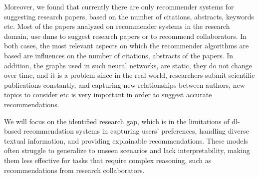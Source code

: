 Moreover, we found that currently there are only recommender systems for suggesting research papers, based on the number of citations, abstracts, keywords etc.
Most of the papers analyzed on recommender systems in the research domain, use \glspl{dnn} to suggest research papers or to recommend collaborators.
In both cases, the most relevant aspects on which the recommender algorithms are based are influences on the number of citations, abstracts of the papers.
In addition, the graphs used in such neural networks, are static, they do not change over time, and it is a problem since in the real world, researchers submit scientific publications constantly, and capturing new relationships between authors, new topics to consider etc is very important in order to suggest accurate recommendations.

We will focus on the identified research gap, which is in the limitations of \gls{dl}-based recommendation systems in capturing users' preferences, handling diverse textual information, and providing explainable recommendations.
These models often struggle to generalize to unseen scenarios and lack interpretability, making them less effective for tasks that require complex reasoning, such as recommendations from research collaborators.